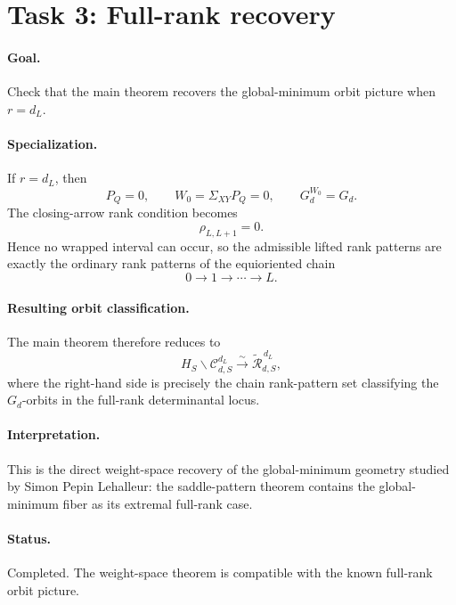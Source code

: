\section*{Task 3: Full-rank recovery}

\paragraph{Goal.}
Check that the main theorem recovers the global-minimum orbit picture when
\(r=d_L\).

\paragraph{Specialization.}
If \(r=d_L\), then
\[
P_Q=0,
\qquad
W_0=\Sigma_{XY}P_Q=0,
\qquad
G_d^{W_0}=G_d.
\]
The closing-arrow rank condition becomes
\[
\rho_{L,L+1}=0.
\]
Hence no wrapped interval can occur, so the admissible lifted rank patterns are
exactly the ordinary rank patterns of the equioriented chain
\[
0\to 1\to \cdots \to L.
\]

\paragraph{Resulting orbit classification.}
The main theorem therefore reduces to
\[
H_S\backslash \mathcal C_{d,S}^{d_L}
\xrightarrow{\sim}
\widetilde{\mathcal R}_{d,S}^{\,d_L},
\]
where the right-hand side is precisely the chain rank-pattern set classifying
the \(G_d\)-orbits in the full-rank determinantal locus.

\paragraph{Interpretation.}
This is the direct weight-space recovery of the global-minimum geometry studied
by Simon Pepin Lehalleur: the saddle-pattern theorem contains the global-minimum
fiber as its extremal full-rank case.

\paragraph{Status.}
Completed. The weight-space theorem is compatible with the known full-rank
orbit picture.
